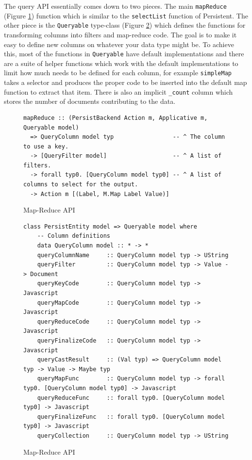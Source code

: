 \documentclass{chi2009}
\newcommand{\code}[1]{\texttt{#1}}
\begin{document}
The query API essentially comes down to two pieces.  The main \code{mapReduce} (Figure \ref{mrapi}) function which is similar to the \code{selectList} function of Persistent.  The other piece is the \code{Queryable} type-class (Figure \ref{queryable}) which defines the functions for transforming columns into filters and map-reduce code.  The goal is to make it easy to define new columns on whatever your data type might be.  To achieve this, most of the functions in \code{Queryable} have default implementations and there are a suite of helper functions which work with the default implementations to limit how much needs to be defined for each column, for example \code{simpleMap} takes a selector and produces the proper code to be inserted into the default map function to extract that item.  There is also an implicit \code{\_count} column which stores the number of documents contributing to the data.

\begin{figure}[t]
\begin{verbatim}
mapReduce :: (PersistBackend Action m, Applicative m, Queryable model)
  => QueryColumn model typ                 -- ^ The column to use a key.
  -> [QueryFilter model]                   -- ^ A list of filters.
  -> forall typ0. [QueryColumn model typ0] -- ^ A list of columns to select for the output.
  -> Action m [(Label, M.Map Label Value)]
\end{verbatim}
    \caption{Map-Reduce API}
    \label{mrapi}
\end{figure}

\begin{figure}[t]
\begin{verbatim}
class PersistEntity model => Queryable model where
    -- Column definitions
    data QueryColumn model :: * -> *
    queryColumnName     :: QueryColumn model typ -> UString
    queryFilter         :: QueryColumn model typ -> Value -> Document
    queryKeyCode        :: QueryColumn model typ -> Javascript
    queryMapCode        :: QueryColumn model typ -> Javascript
    queryReduceCode     :: QueryColumn model typ -> Javascript
    queryFinalizeCode   :: QueryColumn model typ -> Javascript
    queryCastResult     :: (Val typ) => QueryColumn model typ -> Value -> Maybe typ
    queryMapFunc        :: QueryColumn model typ -> forall typ0. [QueryColumn model typ0] -> Javascript
    queryReduceFunc     :: forall typ0. [QueryColumn model typ0] -> Javascript
    queryFinalizeFunc   :: forall typ0. [QueryColumn model typ0] -> Javascript
    queryCollection     :: QueryColumn model typ -> UString
\end{verbatim}
    \caption{Map-Reduce API}
    \label{queryable}
\end{figure}
\end{document}
